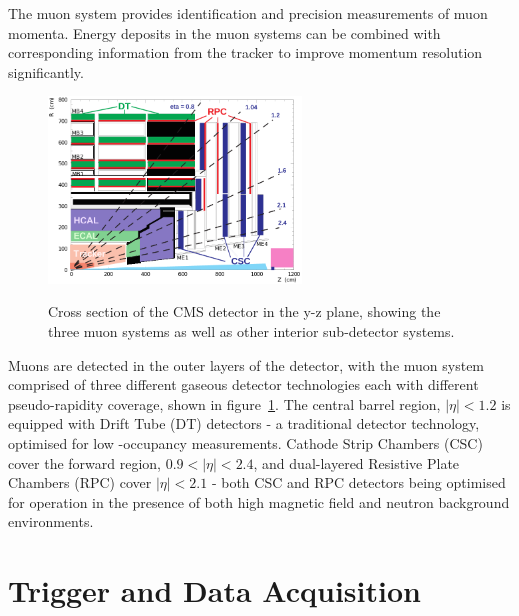 
The muon system provides identification and precision measurements of
muon momenta. Energy deposits in the muon systems can be combined with 
corresponding information from the tracker to improve momentum resolution
significantly.

\begin{figure}[ht!]
\centering
\includegraphics[width=0.6\textwidth]{Figs/machine/pictures_MuonSys-mod3.png}
\label{fig:muon_system_diagram}
\caption{Cross section of the CMS detector in the y-z plane, showing the three 
muon systems as well as other interior sub-detector systems.}
\end{figure}

Muons are detected in the outer layers of the detector, with the muon system 
comprised of three different gaseous detector technologies each with different 
pseudo-rapidity coverage, shown in figure~\ref{fig:muon_system_diagram}. The
central barrel region, $|\eta|<1.2$ is equipped with 
Drift Tube (DT) detectors - a traditional detector technology, optimised for low
-occupancy measurements. Cathode Strip Chambers (CSC) cover the forward region,
$0.9 < |\eta| < 2.4$, and dual-layered Resistive Plate Chambers (RPC) cover
$|\eta| < 2.1$ - both CSC and RPC detectors being optimised for operation in 
the presence of both high magnetic field and neutron background environments.

\section{Trigger and Data Acquisition}  %
\label{sec:detector_trigger}

